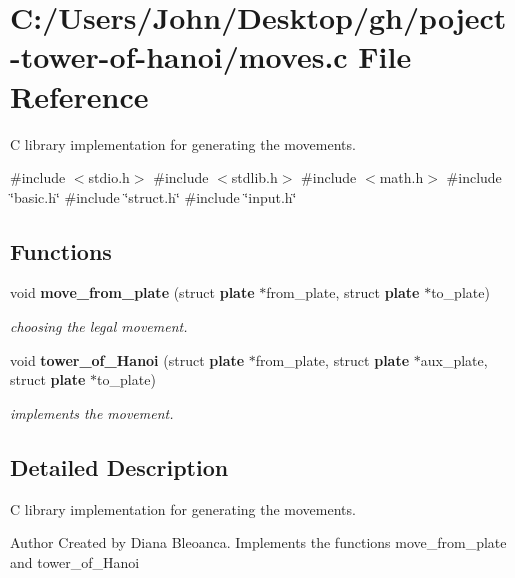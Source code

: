 \section{C\+:/\+Users/\+John/\+Desktop/gh/poject-\/tower-\/of-\/hanoi/moves.c File Reference}
\label{moves_8c}


C library implementation for generating the movements.  


{\ttfamily \#include $<$stdio.\+h$>$}\newline
{\ttfamily \#include $<$stdlib.\+h$>$}\newline
{\ttfamily \#include $<$math.\+h$>$}\newline
{\ttfamily \#include \char`\"{}basic.\+h\char`\"{}}\newline
{\ttfamily \#include \char`\"{}struct.\+h\char`\"{}}\newline
{\ttfamily \#include \char`\"{}input.\+h\char`\"{}}\newline
\subsection*{Functions}
\begin{DoxyCompactItemize}
\item 
void \textbf{ move\+\_\+from\+\_\+plate} (struct \textbf{ plate} $\ast$from\+\_\+plate, struct \textbf{ plate} $\ast$to\+\_\+plate)
\begin{DoxyCompactList}\small\item\em choosing the legal movement. \end{DoxyCompactList}\item 
void \textbf{ tower\+\_\+of\+\_\+\+Hanoi} (struct \textbf{ plate} $\ast$from\+\_\+plate, struct \textbf{ plate} $\ast$aux\+\_\+plate, struct \textbf{ plate} $\ast$to\+\_\+plate)
\begin{DoxyCompactList}\small\item\em implements the movement. \end{DoxyCompactList}\end{DoxyCompactItemize}


\subsection{Detailed Description}
C library implementation for generating the movements. 

\begin{DoxyAuthor}{Author}
Created by Diana Bleoanca. Implements the functions move\+\_\+from\+\_\+plate and tower\+\_\+of\+\_\+\+Hanoi 
\end{DoxyAuthor}


